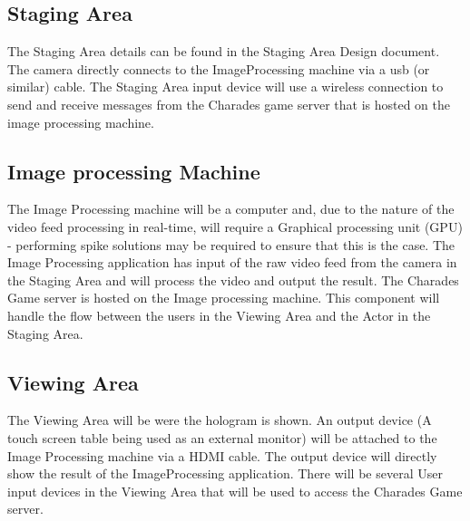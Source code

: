 \documentclass{article}
\begin{document}
\subsection{Staging Area}
The Staging Area details can be found in the Staging Area Design document. The camera directly connects to the ImageProcessing machine via a usb (or similar) cable. The Staging Area input device will use a wireless connection to send and receive messages from the Charades game server that is hosted on the image processing machine.
 
\subsection{Image processing Machine}
The Image Processing machine will be a computer and, due to the nature of the video feed processing in real-time, will require a Graphical processing unit (GPU) - performing spike solutions may be required to ensure that this is the case. The Image Processing application has input of the raw video feed from the camera in the Staging Area and will process the video and output the result.
The Charades Game server is hosted on the Image processing machine. This component will handle the flow between the users in the Viewing Area and the Actor in the Staging Area.

\subsection{Viewing Area}
The Viewing Area will be were the hologram is shown. An output device (A touch screen table being used as an external monitor) will be attached to the Image Processing machine via a HDMI cable. The output device will directly show the result of the ImageProcessing application.
There will be several User input devices in the Viewing Area that will be used to access the Charades Game server.
\end{document}
